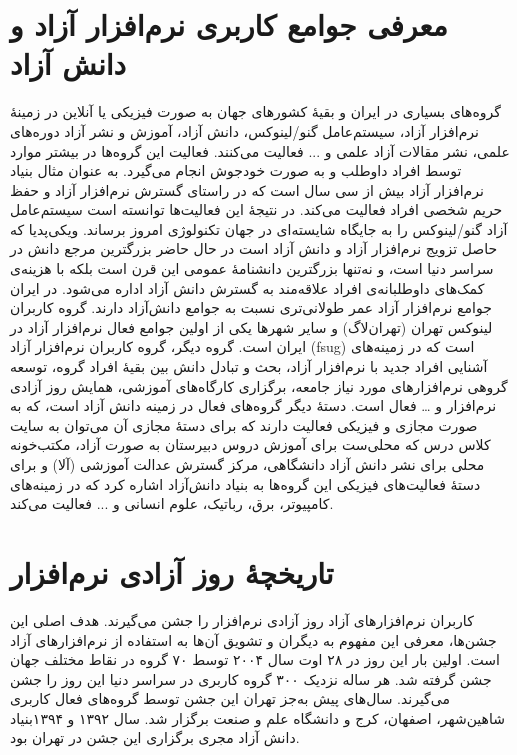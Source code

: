 \documentclass{article}
\begin{document}
\section{معرفی جوامع کاربری نرم‌افزار آزاد و دانش آزاد}
گروه‌های بسیاری در ایران و بقیهٔ کشورهای جهان به صورت فیزیکی یا آنلاین در زمینهٔ نرم‌افزار آزاد، سیستم‌عامل‌ گنو/لینوکس، دانش آزاد، آموزش و نشر آزاد دوره‌های علمی، نشر مقالات آزاد علمی و ... فعالیت می‌کنند. فعالیت این گروه‌ها در بیشتر موارد توسط افراد داوطلب و به صورت خودجوش انجام می‌گیرد.
به عنوان مثال بنیاد نرم‌افزار آزاد بیش از سی سال است که در راستای گسترش نرم‌افزار آزاد و حفظ حریم شخصی افراد فعالیت می‌کند. در نتیجهٔ این فعالیت‌ها توانسته است سیستم‌عامل آزاد گنو/لینوکس را به جایگاه شایسته‌ای در جهان تکنولوژی امروز برساند.
ویکی‌پدیا که حاصل تزویج نرم‌افزار آزاد و دانش آزاد است در حال حاضر بزرگترین مرجع دانش در سراسر دنیا است، و نه‌تنها بزرگترین دانشنامهٔ عمومی این قرن است بلکه با هزینه‌ی کمک‌های داوطلبانه‌ی افراد علاقه‌مند به گسترش دانش آزاد اداره می‌شود.
در ایران جوامع نرم‌افزار آزاد عمر طولانی‌تری نسبت به جوامع دانش‌آزاد دارند. گروه کاربران لینوکس تهران (تهران‌لاگ) و سایر شهرها یکی از اولین جوامع فعال نرم‌افزار آزاد در ایران است.
گروه دیگر، گروه کاربران نرم‌افزار آزاد (fsug) است که در زمینه‌های آشنایی افراد جدید با نرم‌افزار آزاد، بحث و تبادل دانش بین بقیهٔ افراد گروه، توسعه گروهی نرم‌افزار‌های مورد نیاز جامعه، برگزاری کارگاه‌های آموزشی، همایش‌ روز آزادی نرم‌افزار و … فعال است.
دستهٔ دیگر گروه‌های فعال در زمینه دانش آزاد است، که به صورت مجازی و فیزیکی فعالیت دارند که برای دستهٔ مجازی آن می‌توان به سایت کلاس درس
 که محلی‌ست برای آموزش دروس دبیرستان به صورت آزاد، مکتب‌خونه محلی برای نشر دانش آزاد دانشگاهی،‌ مرکز گسترش عدالت آموزشی (آلا) و برای دستهٔ فعالیت‌های فیزیکی این گروه‌ها به بنیاد دانش‌آزاد اشاره کرد که در زمینه‌های کامپیوتر، برق، رباتیک، علوم انسانی و ... فعالیت می‌کند.
\section{تاریخچهٔ روز آزادی نرم‌افزار}
کاربران نرم‌افزارهای آزاد روز آزادی نرم‌افزار را جشن می‌گیرند. هدف اصلی این جشن‌ها، معرفی این مفهوم به دیگران و تشویق آن‌ها به استفاده از نرم‌افزارهای آزاد است.
اولین بار این روز در ۲۸ اوت سال ۲۰۰۴ توسط ۷۰ گروه در نقاط مختلف جهان جشن گرفته شد. هر ساله نزدیک ۳۰۰ گروه کاربری در سراسر دنیا این روز را جشن می‌گیرند. سال‌های پیش به‌جز تهران این جشن توسط گروه‌های فعال کاربری شاهین‌شهر، اصفهان، کرج و دانشگاه علم و صنعت برگزار شد. سال ۱۳۹۲ و ۱۳۹۴بنیاد دانش آزاد مجری برگزاری این جشن در تهران بود.
\end{document}

